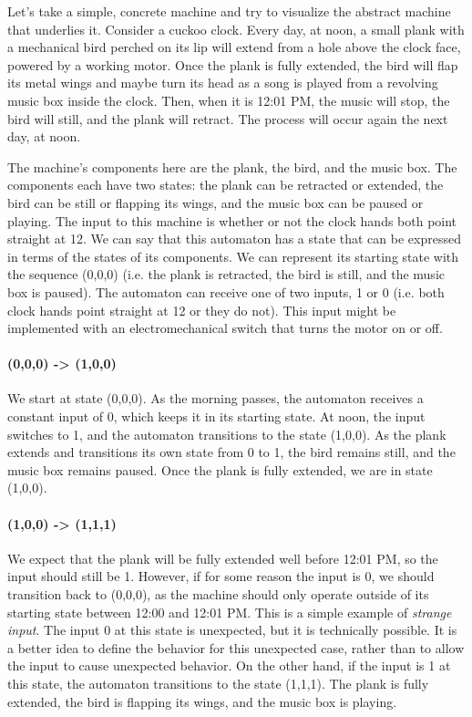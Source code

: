 Let's take a simple, concrete machine and try to visualize the abstract machine that underlies it. Consider a cuckoo clock. Every day, at noon, a small plank with a mechanical bird perched on its lip will extend from a hole above the clock face, powered by a working motor. Once the plank is fully extended, the bird will flap its metal wings and maybe turn its head as a song is played from a revolving music box inside the clock. Then, when it is 12:01 PM, the music will stop, the bird will still, and the plank will retract. The process will occur again the next day, at noon.

The machine's components here are the plank, the bird, and the music box. The components each have two states: the plank can be retracted or extended, the bird can be still or flapping its wings, and the music box can be paused or playing. The input to this machine is whether or not the clock hands both point straight at 12. We can say that this automaton has a state that can be expressed in terms of the states of its components. We can represent its starting state with the sequence (0,0,0) (i.e. the plank is retracted, the bird is still, and the music box is paused). The automaton can receive one of two inputs, 1 or 0 (i.e. both clock hands point straight at 12 or they do not). This input might be implemented with an electromechanical switch that turns the motor on or off.

\paragraph{(0,0,0) -> (1,0,0)} We start at state (0,0,0). As the morning passes, the automaton receives a constant input of 0, which keeps it in its starting state. At noon, the input switches to 1, and the automaton transitions to the state (1,0,0). As the plank extends and transitions its own state from 0 to 1, the bird remains still, and the music box remains paused. Once the plank is fully extended, we are in state (1,0,0).

\paragraph{(1,0,0) -> (1,1,1)} We expect that the plank will be fully extended well before 12:01 PM, so the input should still be 1. However, if for some reason the input is 0, we should transition back to (0,0,0), as the machine should only operate outside of its starting state between 12:00 and 12:01 PM. This is a simple example of \textit{strange input}. The input 0 at this state is unexpected, but it is technically possible. It is a better idea to define the behavior for this unexpected case, rather than to allow the input to cause unexpected behavior. On the other hand, if the input is 1 at this state, the automaton transitions to the state (1,1,1). The plank is fully extended, the bird is flapping its wings, and the music box is playing.


